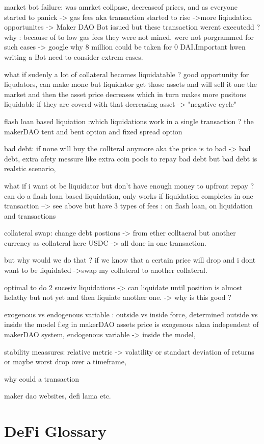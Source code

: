 \documentclass{article}
\begin{document}
market bot failure: was  amrket collpase, decreaseof prices, and as everyone started to panick -> gas fees aka transaction started to rise ->more liqiudation opportunites -> Maker DAO Bot issued but these transaction werent executedd ? why : because of to low gas fees they were not mined, were not porgrammed for such cases  -> google why 8 million could be taken for 0 DAI.Important hwen writing a Bot need to consider extrem cases.

what if sudenly a lot of collateral becomes liquidatable ? good opportunity for liqudators, can make mone but liquidator get those assets and will sell it one the market and then the asset price decreases which in turn makes more positons liquidable if they are coverd with that decreasing asset  -> "negative cycle"

flash loan based liquiation :which liquidations work in a single transaction ? the makerDAO tent and bent option and fixed spread option 

bad debt: if none will buy the collteral anymore aka the price is to bad -> bad debt, extra afety messure like extra coin pools to repay bad debt but bad debt is realstic scenario, 

 what if i want ot be liquidator but don't have enough money to upfront repay ? can do a flash loan based liquidation, only works if liquidation completes in one transaction --> see above but have 3 types of fees : on flash loan, on liquidation and transactions 

 collateral swap:
change debt postions -> from ether colltaeral but another currency as collateral here USDC -> all done in one transaction.

but why would we do that ? if we know that a certain price will drop and i dont want to be liquidated ->swap my collateral to another collateral.

optimal to do 2 sucesiv liquidations -> can liquidate until position is almost helathy but not yet and then liquiate another one. -> why is this good ?

exogenous vs endogenous variable : outside vs inside force, determined outside vs inside the model f.eg in makerDAO assets price is exogenous akaa independent of makerDAO system,
endogenous variable -> inside the model, 


stability meassures: relative metric -> volatility or standart deviation of returns or maybe worst drop over a timeframe, 



why could a transaction 

maker dao websites, defi lama etc.

\section{DeFi Glossary}
 
\end{document}
